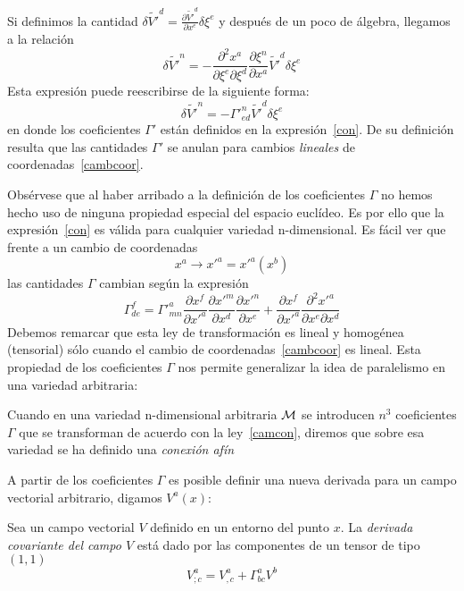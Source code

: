 %
Si    definimos   la    cantidad   $\delta    \tilde{V'}^d    =   \frac{\partial
  \tilde{V'}^d}{\partial x^e} \delta \xi^e$ y despu\'es de un poco de \'algebra,
llegamos a la relaci\'on
%
\begin{equation}
\delta \tilde{V'}^n = - \frac{\partial^2 x^a}{\partial \xi^e \partial \xi^d} \frac{\partial \xi^n}{\partial x^a} \tilde{V'}^d \delta \xi^e \label{con}
\end{equation}
%
Esta expresi\'on puede reescribirse de la siguiente forma:
%
\begin{equation}
\delta \tilde{V'}^n = - \Gamma'^n_{ed} \tilde{V'}^d \delta \xi^e
\end{equation}
%
\noindent  en   donde  los  coeficientes  $\Gamma'$  est\'an   definidos  en  la
expresi\'on~\eqref{con}. De su definici\'on resulta que las cantidades $\Gamma'$
se anulan para cambios {\it lineales} de coordenadas~\eqref{cambcoor}.

Obs\'ervese que al haber arribado a la definici\'on de los coeficientes $\Gamma$
no hemos hecho uso de ninguna  propiedad especial del espacio eucl\'ideo. Es por
ello  que  la  expresi\'on~\eqref{con}   es  v\'alida  para  cualquier  variedad
n-dimensional. Es f\'acil ver que frente a un cambio de coordenadas
%
\begin{equation}
x^a \rightarrow x'^a= x'^a\left(x^b\right) \label{camb2}
\end{equation}
%
las cantidades $\Gamma$ cambian seg\'un la expresi\'on
%
\begin{equation}
\Gamma ^f_{de} = \Gamma'^a_{mn} \frac{\partial x^f}{\partial x'^a} \frac{\partial x'^m}{\partial x^d} \frac{\partial x'^n}{\partial x^e}+\frac{\partial x^f}{\partial x'^a} \frac{\partial^2 x'^a}{\partial x^e \partial x^d} \label{camcon}
\end{equation}
%
Debemos  remarcar que  esta  ley  de transformaci\'on  es  lineal y  homog\'enea
(tensorial)   s\'olo  cuando  el   cambio  de   coordenadas~\eqref{cambcoor}  es
lineal. Esta propiedad  de los coeficientes $\Gamma$ nos  permite generalizar la
idea de paralelismo en una variedad arbitraria:
%
\begin{definicion}[Conexi\'on af\'in]
  Cuando  en una  variedad  n-dimensional arbitraria  $\mathcal{M}$  se introducen  $n^3$
  coeficientes $\Gamma$ que se transforman de acuerdo con la ley~\eqref{camcon},
  diremos que sobre esa variedad se ha definido una {\it conexi\'on af\'in}
\end{definicion}

A partir de los coeficientes $\Gamma$ es posible definir una nueva derivada para
un campo vectorial arbitrario, digamos $V^a(x)$:
%
\begin{definicion}
  Sea  un campo vectorial  $V$ definido  en un  entorno del  punto $x$.  La {\it
    derivada covariante  del campo  $V$} est\'a dado  por las componentes  de un
  tensor de tipo $(1,1)$
  \[
  V^a_{;c} = V^a_{,c} + \Gamma^a_{bc} V^b
  \]
\end{definicion}

